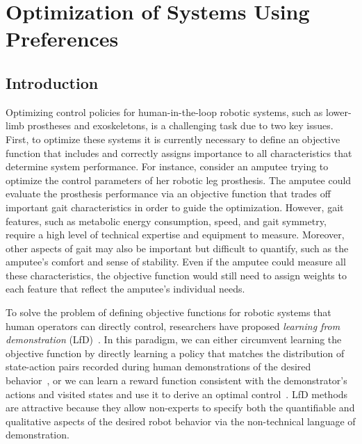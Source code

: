\section{Optimization of Systems Using
    Preferences}\label{sec:completed_pref_opt}

\subsection{Introduction} 
Optimizing control policies for human-in-the-loop robotic systems, such as
lower-limb prostheses and exoskeletons, is a challenging task due to two key
issues. First, to optimize these systems it is currently necessary to define an
objective function that includes and correctly assigns importance to all
characteristics that determine system performance. For instance, consider an
amputee trying to optimize the control parameters of her robotic leg prosthesis.
The amputee could evaluate the prosthesis performance via an objective function
that trades off important gait characteristics in order to guide the
optimization. However, gait features, such as metabolic energy consumption,
speed, and gait symmetry, require a high level of technical expertise and
equipment to measure. Moreover, other aspects of gait may also be important but
difficult to quantify, such as the amputee's comfort and sense of stability.
Even if the amputee could measure all these characteristics, the objective
function would still need to assign weights to each feature that reflect the
amputee's individual needs.

To solve the problem of defining objective functions for robotic systems that
human operators can directly control, researchers have proposed \emph{learning
from demonstration} (LfD)~\citep{argall2009survey}. In this paradigm, we can
either circumvent learning the objective function by directly learning a policy
that matches the distribution of state-action pairs recorded during human
demonstrations of the desired behavior~\citep{pomerleau1991efficient,
schaal1999imitation}, or we can learn a reward function consistent with the
demonstrator's actions and visited states and use it to derive an optimal
control~\citep{ng2000algorithms, ratliff2006maximum, ziebart2009human}. LfD
methods are attractive because they allow non-experts to specify both the
quantifiable and qualitative aspects of the desired robot behavior via the
non-technical language of demonstration.

